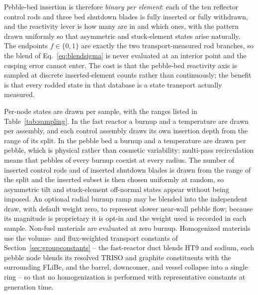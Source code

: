 \documentclass[preprint,12pt]{elsarticle}
\begin{document}
Pebble-bed insertion is therefore \emph{binary per element}: each of the ten
reflector control rods and three bed shutdown blades is fully inserted or fully
withdrawn, and the reactivity lever is how many are in and which ones, with the
pattern drawn uniformly so that asymmetric and stuck-element states arise
naturally. The endpoints $f\in\{0,1\}$ are exactly the two transport-measured rod
branches, so the blend of Eq.~\eqref{eq:blendsigma} is never evaluated at an
interior point and the cusping error cannot enter. The cost is that the pebble-bed
reactivity axis is sampled at discrete inserted-element counts rather than
continuously; the benefit is that every rodded state in that database is a state
transport actually measured.

Per-node states are drawn per sample, with the ranges listed in
Table~\ref{tab:sampling}. In the fast reactor a burnup and a temperature are
drawn per assembly, and each control assembly draws its own insertion depth
from the range of its split. In the pebble bed a burnup and a temperature are
drawn per pebble, which is physical rather than cosmetic variability:
multi-pass recirculation means that pebbles of every burnup coexist at every
radius. The number of inserted control rods and of inserted shutdown blades is
drawn from the range of the split and the inserted subset is then chosen
uniformly at random, so asymmetric tilt and stuck-element off-normal states
appear without being imposed. An optional radial burnup
ramp may be blended into the independent draw, with default weight zero, to
represent slower near-wall pebble flow; because its magnitude is proprietary it
is opt-in and the weight used is recorded in each sample. Non-fuel materials
are evaluated at zero burnup. Homogenized materials use the volume- and
flux-weighted transport constants of Section~\ref{sec:groupconstants} -- the
fast-reactor duct blends HT9 and sodium, each pebble node blends its resolved
TRISO and graphite constituents with the surrounding FLiBe, and the barrel,
downcomer, and vessel collapse into a single ring -- so that no homogenization
is performed with representative constants at generation time.
\end{document}

